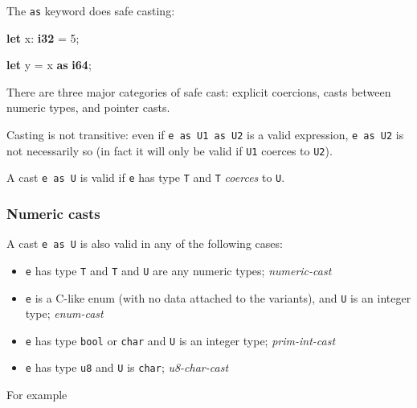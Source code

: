 \documentclass[a4paper,]{book}
\newenvironment{Shaded}{\begin{snugshade}}{\end{snugshade}}
\newcommand{\KeywordTok}[1]{\textcolor[rgb]{0.13,0.29,0.53}{\textbf{{#1}}}}
\newcommand{\DecValTok}[1]{\textcolor[rgb]{0.00,0.00,0.81}{{#1}}}
\newcommand{\NormalTok}[1]{{#1}}
\begin{document}
The \texttt{as} keyword does safe casting:

\begin{Shaded}
\begin{Highlighting}[]
\KeywordTok{let} \NormalTok{x: }\KeywordTok{i32} \NormalTok{= }\DecValTok{5}\NormalTok{;}

\KeywordTok{let} \NormalTok{y = x }\KeywordTok{as} \KeywordTok{i64}\NormalTok{;}
\end{Highlighting}
\end{Shaded}

There are three major categories of safe cast: explicit coercions, casts
between numeric types, and pointer casts.

Casting is not transitive: even if \texttt{e\ as\ U1\ as\ U2} is a valid
expression, \texttt{e\ as\ U2} is not necessarily so (in fact it will
only be valid if \texttt{U1} coerces to \texttt{U2}).


A cast \texttt{e\ as\ U} is valid if \texttt{e} has type \texttt{T} and
\texttt{T} \emph{coerces} to \texttt{U}.

\subsubsection{Numeric casts}\label{numeric-casts}

A cast \texttt{e\ as\ U} is also valid in any of the following cases:

\begin{itemize}
\itemsep1pt\parskip0pt
\item
  \texttt{e} has type \texttt{T} and \texttt{T} and \texttt{U} are any
  numeric types; \emph{numeric-cast}
\item
  \texttt{e} is a C-like enum (with no data attached to the variants),
  and \texttt{U} is an integer type; \emph{enum-cast}
\item
  \texttt{e} has type \texttt{bool} or \texttt{char} and \texttt{U} is
  an integer type; \emph{prim-int-cast}
\item
  \texttt{e} has type \texttt{u8} and \texttt{U} is \texttt{char};
  \emph{u8-char-cast}
\end{itemize}

For example
\end{document}
